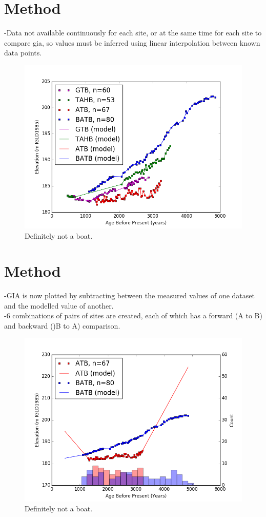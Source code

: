 \documentclass{article}
\begin{document}
\section[2]{Method}
-Data not available continuously for each site, or at the same time for each site to compare gia, so values must be inferred using linear interpolation between known data points.\\
\begin{figure}[h]
	\includegraphics[width=\linewidth]{data/theData.png}
	\caption{Definitely not a boat.}
	\label{fig:dataWithModel}
\end{figure}
\newpage
\section[2]{Method}
-GIA is now plotted by subtracting between the measured values of one dataset and the modelled value of another.\\
-6 combinations of pairs of sites are created, each of which has a forward (A to B) and backward ()B to A) comparison.\\
\newpage
\begin{figure}[h]
	\includegraphics[width=\linewidth]{data/ATB-BATB_DataAndModel.png}
	\caption{Definitely not a boat.}
	\label{fig:data_ATBxBATB}
\end{figure}
\newpage
\end{document}
